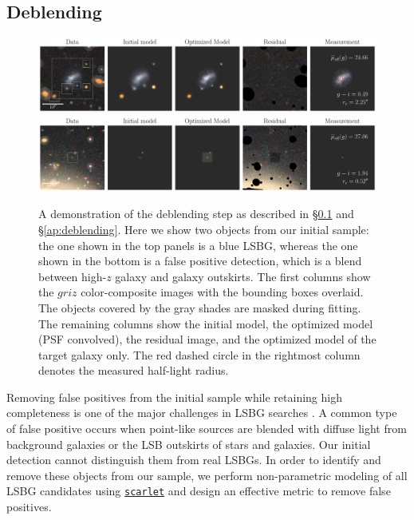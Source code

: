 \documentclass[twocolumn,astrosymb,twocolappendix]{aastex631}
\newcommand{\code}[1]{\texttt{#1}}
\begin{document}
\begin{CJK*}{UTF8}{gbsn}
\subsection{Deblending}\label{sec:deblending}

\begin{figure}
	\vbox{ 
		\centering
		\includegraphics[width=1\linewidth]{vanilla_scarlet_demo.pdf}
		\includegraphics[width=1\linewidth]{vanilla_scarlet_demo2.pdf}
	}
	\caption{A demonstration of the deblending step as described in \S\ref{sec:deblending} and \S\ref{ap:deblending}. Here we show two objects from our initial sample: the one shown in the top panels is a blue LSBG, whereas the one shown in the bottom is a false positive detection, which is a blend between high-$z$ galaxy and galaxy outskirts. The first columns show the $griz$ color-composite images with the bounding boxes overlaid. The objects covered by the gray shades are masked during fitting. The remaining columns show the initial model, the optimized model (PSF convolved), the residual image, and the optimized model of the target galaxy only. The red dashed circle in the rightmost column denotes the measured half-light radius.
	}
	\label{fig:vanilla_scarlet_demo}
\end{figure}

Removing false positives from the initial sample while retaining high completeness is one of the major challenges in LSBG searches \citep[e.g.,][]{vanDokkum2015,Koda2015,Yagi2016,Greco2018,SAGA-I,Zaritsky2019,Zaritsky2021,Tanoglidis2021,Zaritsky2022}. A common type of false positive occurs when point-like sources are blended with diffuse light from background galaxies or the LSB outskirts of stars and galaxies. Our initial detection cannot distinguish them from real LSBGs. In order to identify and remove these objects from our sample, we perform non-parametric modeling of all LSBG candidates using \href{https://pmelchior.github.io/scarlet/}{\code{scarlet}} \citep{Melchior2018} and design an effective metric to remove false positives.



\end{CJK*}
\end{document}
